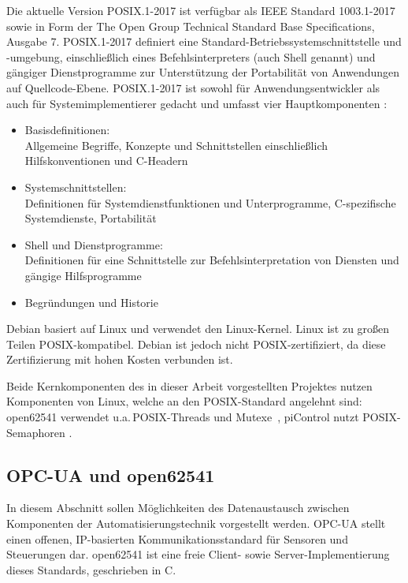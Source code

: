 Die aktuelle Version POSIX.1-2017 ist verfügbar als IEEE Standard 1003.1-2017 sowie in Form der \glqq{}The Open Group Technical Standard Base Specifications\grqq{}, Ausgabe 7. POSIX.1-2017 definiert eine Standard-Betriebssystemschnittstelle und -umgebung, einschließlich eines Befehlsinterpreters (auch Shell genannt) und gängiger Dienstprogramme zur Unterstützung der Portabilität von Anwendungen auf Quellcode-Ebene. POSIX.1-2017 ist sowohl für Anwendungsentwickler als auch für Systemimplementierer gedacht und umfasst vier Hauptkomponenten \citep[vgl.][]{web-opengroup-overview}:
\begin{itemize}
    \item Basisdefinitionen:\\
          Allgemeine Begriffe, Konzepte und Schnittstellen einschließlich Hilfskonventionen und C-Headern
          
    \item Systemschnittstellen:\\
          Definitionen für Systemdienstfunktionen und Unterprogramme, C-spezifische Systemdienste, Portabilität
        
    \item Shell und Dienstprogramme:\\
          Definitionen für eine Schnittstelle zur Befehlsinterpretation von Diensten und gängige Hilfsprogramme
    
    \item Begründungen und Historie
\end{itemize}

Debian basiert auf Linux und verwendet den Linux-Kernel. Linux ist zu großen Teilen POSIX-kompatibel. Debian ist jedoch nicht POSIX-zertifiziert, da diese Zertifizierung mit hohen Kosten verbunden ist\citep[vgl.][Kapitel 4.4.]{web-debian-faq}.

Beide Kernkomponenten des in dieser Arbeit vorgestellten Projektes nutzen Komponenten von Linux, 
welche an den POSIX-Standard angelehnt sind: open62541 verwendet u.a.\,POSIX-Threads und
Mutexe~\citep[vgl.][pthread.h]{web-opengroup-pthread}, piControl nutzt POSIX-Semaphoren
\citep[vgl.][semaphore.h]{web-opengroup-semaphore}. 


\subsection{OPC-UA und open62541%
     \label{sec:2-opc}}
In diesem Abschnitt sollen Möglichkeiten des Datenaustausch zwischen Komponenten der
Automatisierungstechnik vorgestellt werden. OPC-UA stellt einen offenen, IP-basierten Kommunikationsstandard
für Sensoren und Steuerungen dar. open62541 ist eine freie Client- sowie Server-Implementierung dieses
Standards, geschrieben in C.


